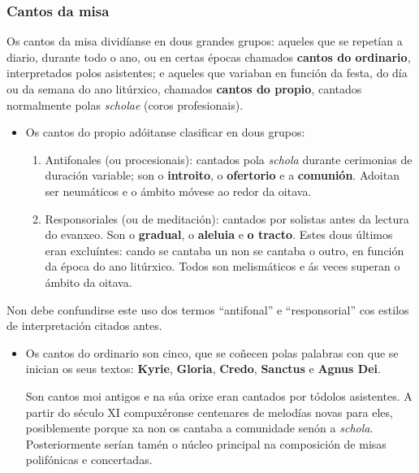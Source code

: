 \documentclass[a4paper, twoside]{templates/ociamthesis}
\providecommand{\tightlist}{%
  \setlength{\itemsep}{0pt}\setlength{\parskip}{0pt}}
\begin{document}
\hypertarget{cantos-da-misa}{%
\subsubsection{Cantos da misa}\label{cantos-da-misa}}

Os cantos da misa dividíanse en dous grandes grupos: aqueles que se repetían a diario, durante todo o ano, ou en certas épocas chamados \textbf{cantos do ordinario}, interpretados polos asistentes; e aqueles que variaban en función da festa, do día ou da semana do ano litúrxico, chamados \textbf{cantos do propio}, cantados normalmente polas \emph{scholae} (coros profesionais).

\begin{itemize}
\item
  Os cantos do propio adóitanse clasificar en dous grupos:

  \begin{enumerate}
  \def\labelenumi{\arabic{enumi}.}
  \tightlist
  \item
    Antifonales (ou procesionais): cantados pola \emph{schola} durante cerimonias de duración variable; son o \textbf{introito}, o \textbf{ofertorio} e a \textbf{comunión}. Adoitan ser neumáticos e o ámbito móvese ao redor da oitava.
  \item
    Responsoriales (ou de meditación): cantados por solistas antes da lectura do evanxeo. Son o \textbf{gradual}, o \textbf{aleluia} e \textbf{o tracto}. Estes dous últimos eran excluíntes: cando se cantaba un non se cantaba o outro, en función da época do ano litúrxico. Todos son melismáticos e ás veces superan o ámbito da oitava.
  \end{enumerate}
\end{itemize}

Non debe confundirse este uso dos termos ``antifonal'' e ``responsorial'' cos estilos de interpretación citados antes.

\begin{itemize}
\item
  Os cantos do ordinario son cinco, que se coñecen polas palabras con que se inician os seus textos: \textbf{Kyrie}, \textbf{Gloria}, \textbf{Credo}, \textbf{Sanctus} e \textbf{Agnus Dei}.

  Son cantos moi antigos e na súa orixe eran cantados por tódolos asistentes. A partir do século XI compuxéronse centenares de melodías novas para eles, posiblemente porque xa non os cantaba a comunidade senón a \emph{schola}. Posteriormente serían tamén o núcleo principal na composición de misas polifónicas e concertadas.
\end{itemize}
\end{document}
